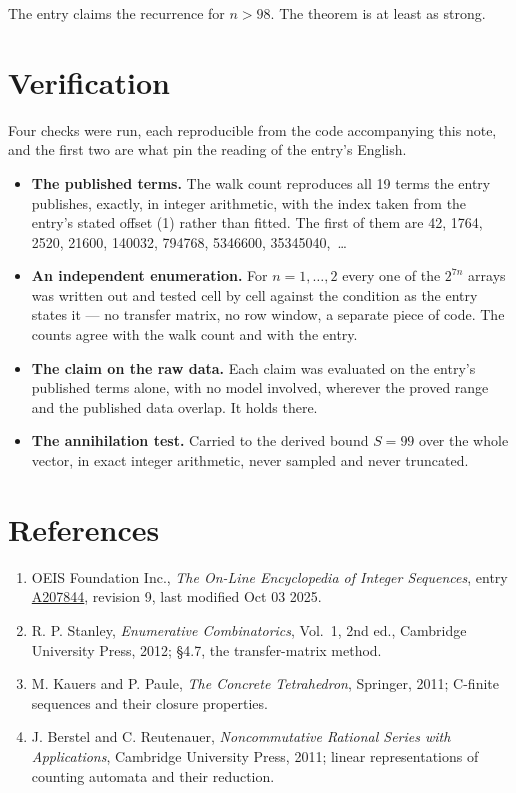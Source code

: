 \documentclass[11pt]{article}
\theoremstyle{definition}
\begin{document}
The entry claims the recurrence for $n > 98$. The theorem is at least as strong.

\section{Verification}

Four checks were run, each reproducible from the code accompanying this note, and the first two are what pin the reading of the entry's English.

\begin{itemize}

\item {\bfseries The published terms.} The walk count reproduces all 19 terms the entry publishes, exactly, in integer arithmetic, with the index taken from the entry's stated offset (1) rather than fitted. The first of them are 42, 1764, 2520, 21600, 140032, 794768, 5346600, 35345040,~\dots

\item {\bfseries An independent enumeration.} For $n = 1,\dots,2$ every one of the $2^{7n}$ arrays was written out and tested cell by cell against the condition as the entry states it --- no transfer matrix, no row window, a separate piece of code. The counts agree with the walk count and with the entry.

\item {\bfseries The claim on the raw data.} Each claim was evaluated on the entry's published terms alone, with no model involved, wherever the proved range and the published data overlap. It holds there.

\item {\bfseries The annihilation test.} Carried to the derived bound $S = 99$ over the whole vector, in exact integer arithmetic, never sampled and never truncated.

\end{itemize}

\section{References}

\begin{enumerate}

\item OEIS Foundation Inc., \emph{The On-Line Encyclopedia of Integer Sequences}, entry \href{https://oeis.org/A207844}{A207844}, revision 9, last modified Oct 03 2025.

\item R. P. Stanley, \emph{Enumerative Combinatorics}, Vol.~1, 2nd ed., Cambridge University Press, 2012; \S4.7, the transfer-matrix method.

\item M. Kauers and P. Paule, \emph{The Concrete Tetrahedron}, Springer, 2011; C-finite sequences and their closure properties.

\item J. Berstel and C. Reutenauer, \emph{Noncommutative Rational Series with Applications}, Cambridge University Press, 2011; linear representations of counting automata and their reduction.

\end{enumerate}
\end{document}
